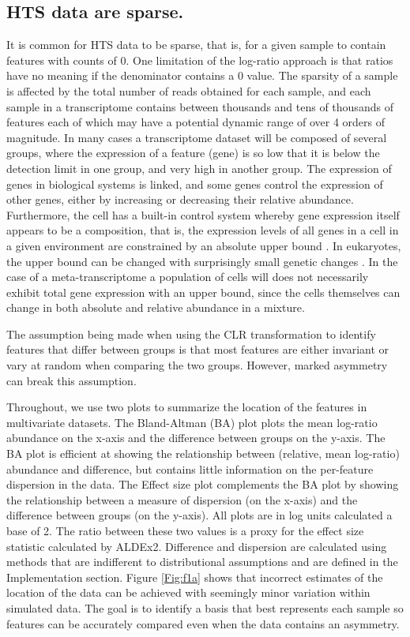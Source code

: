 \documentclass{bmcart}
\begin{document}
\subsection*{HTS data are sparse.}It is common for HTS data to be sparse, that is, for a given sample to contain features with counts of 0. One limitation of the log-ratio approach is that ratios have no meaning if the denominator contains a 0 value. The sparsity of a sample is affected by the total number of reads obtained for each sample, and each sample in a transcriptome contains between thousands and tens of thousands of features each of which may have a potential dynamic range of over 4 orders of magnitude. In many cases a transcriptome dataset will be composed of several groups, where the expression of a feature (gene) is so low that it is below the detection limit in one group, and very high in another group. The expression of genes in biological systems is linked, and some genes control the expression of other genes, either by increasing or decreasing their relative abundance. Furthermore, the cell has a built-in control system whereby gene expression itself appears to be a composition, that is, the expression levels of all genes in a cell in a given environment are constrained by an absolute upper bound  \cite{Scott:2010}. In eukaryotes, the upper bound can be changed with surprisingly small genetic changes \cite{Loven:2012aa}. In the case of a meta-transcriptome a population of cells will does not necessarily exhibit total gene expression with an upper bound, since the cells themselves can change in both absolute and relative abundance in a mixture. 

The assumption being made when using the CLR transformation to identify features that differ between groups is that most features are either invariant or vary at random when comparing the two groups. However, marked asymmetry can break this assumption.


Throughout, we use two plots to summarize the location of the features in multivariate datasets. The Bland-Altman (BA) plot  \cite{altman:1983} plots the mean log-ratio abundance on the x-axis and the difference between groups on the y-axis. The BA plot is efficient at showing the relationship between (relative, mean log-ratio) abundance and difference, but contains little information on the per-feature dispersion in the data. The Effect size plot \cite{gloor:effect} complements the BA plot by showing the relationship between a measure of dispersion (on the x-axis) and the difference between groups (on the y-axis). All plots are in log units calculated a base of 2. The ratio between these two values is a proxy for the effect size statistic calculated by ALDEx2. Difference and dispersion are calculated using methods that are indifferent to distributional assumptions and are defined in the Implementation section. Figure \ref{Fig:f1a} shows that incorrect estimates of the location of the data can be achieved with seemingly minor variation within simulated data. The goal is to identify a basis that best represents each sample so features can be accurately compared even when the data contains an asymmetry.
\end{document}
